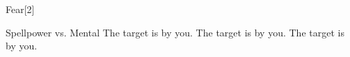 \begin{spellsection}{Fear}[2]
    \begin{spellheader}
    \end{spellheader}
    \begin{spellcontent}
        \begin{spelltargetinginfo}
        \end{spelltargetinginfo}
        \begin{spelleffects}
            \begin{spellattack}{Spellpower vs. Mental}
                \spellsuccess The target is \frightened by you.
                \spellcritical The target is \panicked by you.
                \spellfailure The target is \shaken by you.
            \end{spellattack}
            \spelldur \durbrief
        \end{spelleffects}
    \end{spellcontent}
    \begin{spellfooter}
        \miscastrandom
    \end{spellfooter}
    \begin{spellaugments}
    \end{spellaugments}
\end{spellsection}

